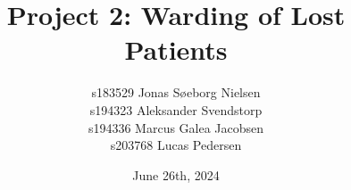 \title{Project 2: Warding of Lost Patients}
\author{s183529 Jonas Søeborg Nielsen\\s194323 Aleksander Svendstorp\\s194336 Marcus Galea Jacobsen\\s203768 Lucas Pedersen}
\date{June 26th, 2024}
\newcommand\course{02443 Stochastic Simulation}













\printbibliography

\newpage
\appendix


